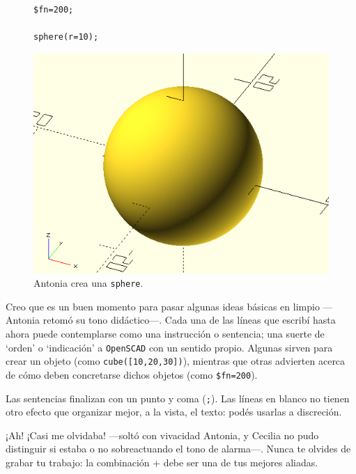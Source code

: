 \begin{figure}[ht]
  \begin{minipage}[]{.4\textwidth}
    \begin{lstlisting}
$fn=200;
      
sphere(r=10);
    \end{lstlisting}%
  \end{minipage}\hfill
  \begin{minipage}[]{.6\textwidth}
    \centering
    \includegraphics[width=.9\textwidth]{imagenes/esfera}
  \end{minipage}
   \caption{Antonia crea una \lstinline!sphere!.}
  \label{fig:sphere}
\end{figure}


\guillemotright Creo que es un buen momento para pasar algunas ideas
básicas en limpio ---Antonia retomó su tono di\-dác\-ti\-co---. Cada
una de las líneas que escribí hasta ahora puede contemplarse como una
instrucción o sentencia; una suerte de `orden' o `indicación' a
\texttt{OpenSCAD} con un sentido propio. Algunas sirven para crear un
objeto (como \lstinline!cube([10,20,30])!), mientras que otras
advierten acerca de cómo deben concretarse dichos objetos (como
\lstinline!$fn=200!). %


\guillemotright Las sentencias finalizan con un punto y coma
(\texttt{;}). Las líneas en blanco no tienen otro efecto que organizar
mejor, a la vista, el texto: podés usarlas a discreción.



\guillemotright ¡Ah! ¡Casi me olvidaba! ---soltó con vivacidad
Antonia, y Cecilia no pudo distinguir si estaba o no sobreactuando el
tono de alarma---. Nunca te olvides de grabar tu trabajo: la
combinación + debe ser una de tus mejores
aliadas.


